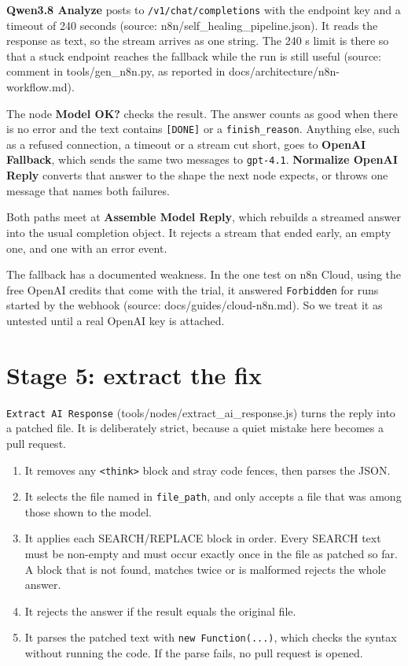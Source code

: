 \documentclass[11pt,a4paper]{report}
\begin{document}
\textbf{Qwen3.8 Analyze} posts to \texttt{/\allowbreak{}v1/\allowbreak{}chat/\allowbreak{}completions} with the endpoint key and a timeout of 240 seconds (source: n8n/self\_healing\_pipeline.json). It reads the response as text, so the stream arrives as one string. The 240 s limit is there so that a stuck endpoint reaches the fallback while the run is still useful (source: comment in tools/gen\_n8n.py, as reported in docs/architecture/n8n-workflow.md).

The node \textbf{Model OK?} checks the result. The answer counts as good when there is no error and the text contains \texttt{[DONE]} or a \texttt{finish\_\allowbreak{}reason}. Anything else, such as a refused connection, a timeout or a stream cut short, goes to \textbf{OpenAI Fallback}, which sends the same two messages to \texttt{gpt-\allowbreak{}4.\allowbreak{}1}. \textbf{Normalize OpenAI Reply} converts that answer to the shape the next node expects, or throws one message that names both failures.

Both paths meet at \textbf{Assemble Model Reply}, which rebuilds a streamed answer into the usual completion object. It rejects a stream that ended early, an empty one, and one with an error event.

The fallback has a documented weakness. In the one test on n8n Cloud, using the free OpenAI credits that come with the trial, it answered \texttt{Forbidden} for runs started by the webhook (source: docs/guides/cloud-n8n.md). So we treat it as untested until a real OpenAI key is attached.

\section{Stage 5: extract the fix}

\texttt{Extract AI Response} (tools/nodes/extract\_ai\_response.js) turns the reply into a patched file. It is deliberately strict, because a quiet mistake here becomes a pull request.

\begin{enumerate}[leftmargin=*,itemsep=2pt]
\item It removes any \texttt{\textless{}think\textgreater{}} block and stray code fences, then parses the JSON.
\item It selects the file named in \texttt{file\_\allowbreak{}path}, and only accepts a file that was among those shown to the model.
\item It applies each SEARCH/REPLACE block in order. Every SEARCH text must be non-empty and must occur exactly once in the file as patched so far. A block that is not found, matches twice or is malformed rejects the whole answer.
\item It rejects the answer if the result equals the original file.
\item It parses the patched text with \texttt{new Function(.\allowbreak{}.\allowbreak{}.\allowbreak{})}, which checks the syntax without running the code. If the parse fails, no pull request is opened.
\end{enumerate}
\end{document}
